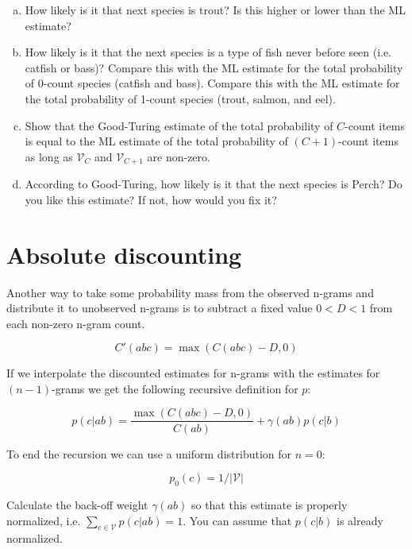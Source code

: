 \documentclass[a4paper]{article}
\newcommand{\vocab}{\mathcal{V}}
\begin{document}
\begin{enumerate}[(a)]
\item How likely is it that next species is trout?  Is this higher or
  lower than the ML estimate?
\vspace*{2cm}

\item How likely is it that the next species is a type of fish never
  before seen (i.e. catfish or bass)?  Compare this with the ML
  estimate for the total probability of 0-count species (catfish and
  bass).  Compare this with the ML estimate for the total probability
  of 1-count species (trout, salmon, and eel).
\vspace*{2cm}

\item Show that the Good-Turing estimate of the total probability of
  $C$-count items is equal to the ML estimate of the total probability
  of $(C+1)$-count items as long as $\vocab_C$ and $\vocab_{C+1}$ are
  non-zero.
\vspace*{4cm}

\item According to Good-Turing, how likely is it that the next species
  is Perch?  Do you like this estimate?  If not, how would you fix it?
\end{enumerate}


\newpage
\section{Absolute discounting}

Another way to take some probability mass from the observed n-grams
and distribute it to unobserved n-grams is to subtract a fixed value
$0<D<1$ from each non-zero n-gram count.

\[ C'(abc) = \max(C(abc) - D, 0) \]

If we interpolate the discounted estimates for n-grams with
the estimates for $(n-1)$-grams we get the following recursive
definition for $p$:

\[ p(c|ab) = \frac{\max(C(abc) - D, 0)}{C(ab)} + \gamma(ab) p(c|b) \]

To end the recursion we can use a uniform distribution for $n=0$:

\[ p_0(c)=1/|\vocab| \]

Calculate the back-off weight $\gamma(ab)$ so that this estimate is
properly normalized, i.e. $\sum_{c\in\vocab} p(c|ab) = 1$.  You can
assume that $p(c|b)$ is already normalized.
\end{document}
